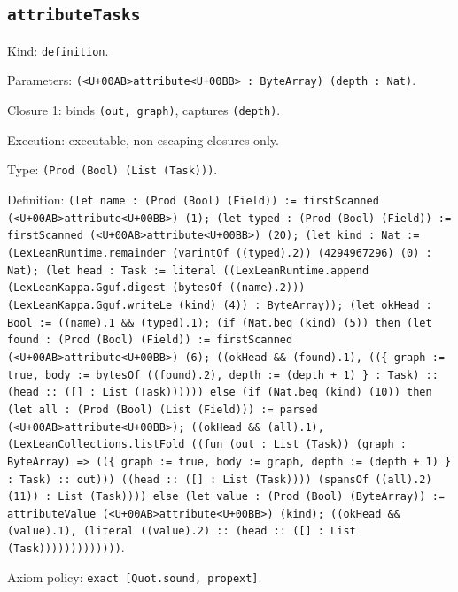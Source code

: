 \documentclass[11pt]{article}
\begin{document}
\subsection*{\texttt{attributeTasks}}
\noindent Kind: \texttt{definition}.\par
\noindent Parameters: \texttt{(<U+00AB>attribute<U+00BB> : ByteArray) (depth : Nat)}.\par
\noindent Closure 1: binds \texttt{(out, graph)}, captures \texttt{(depth)}.\par
\noindent Execution: executable, non-escaping closures only.\par
\noindent Type: \texttt{(Prod (Bool) (List (Task)))}.\par
\noindent Definition: \texttt{(let name : (Prod (Bool) (Field)) := firstScanned (<U+00AB>attribute<U+00BB>) (1); (let typed : (Prod (Bool) (Field)) := firstScanned (<U+00AB>attribute<U+00BB>) (20); (let kind : Nat := (LexLeanRuntime.remainder (varintOf ((typed).2)) (4294967296) (0) : Nat); (let head : Task := literal ((LexLeanRuntime.append (LexLeanKappa.Gguf.digest (bytesOf ((name).2))) (LexLeanKappa.Gguf.writeLe (kind) (4)) : ByteArray)); (let okHead : Bool := ((name).1 \&\& (typed).1); (if (Nat.beq (kind) (5)) then (let found : (Prod (Bool) (Field)) := firstScanned (<U+00AB>attribute<U+00BB>) (6); ((okHead \&\& (found).1), ((\{ graph := true, body := bytesOf ((found).2), depth := (depth + 1) \} : Task) :: (head :: ([] : List (Task)))))) else (if (Nat.beq (kind) (10)) then (let all : (Prod (Bool) (List (Field))) := parsed (<U+00AB>attribute<U+00BB>); ((okHead \&\& (all).1), (LexLeanCollections.listFold ((fun (out : List (Task)) (graph : ByteArray) => ((\{ graph := true, body := graph, depth := (depth + 1) \} : Task) :: out))) ((head :: ([] : List (Task)))) (spansOf ((all).2) (11)) : List (Task)))) else (let value : (Prod (Bool) (ByteArray)) := attributeValue (<U+00AB>attribute<U+00BB>) (kind); ((okHead \&\& (value).1), (literal ((value).2) :: (head :: ([] : List (Task)))))))))))))}.\par
\noindent Axiom policy: \texttt{exact [Quot.sound, propext]}.\par
\end{document}
